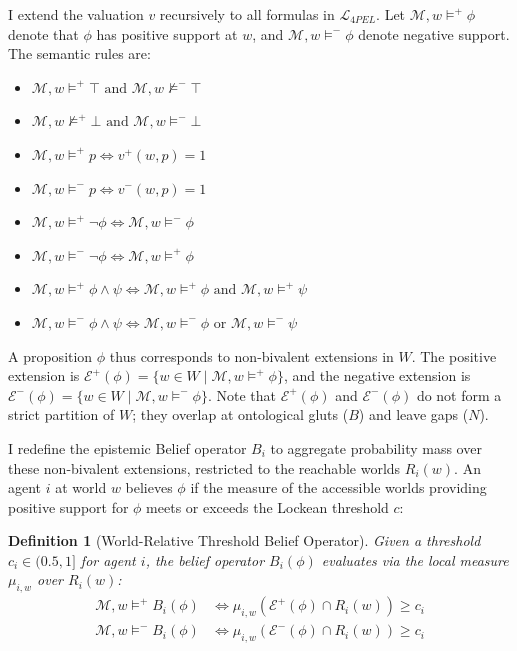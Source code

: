 \documentclass[11pt,a4paper]{article}
\newtheorem{definition}{Definition}[section]
\begin{document}
I extend the valuation $v$ recursively to all formulas in $\mathcal{L}_{4PEL}$. Let $\mathcal{M}, w \models^+ \phi$ denote that $\phi$ has positive support at $w$, and $\mathcal{M}, w \models^- \phi$ denote negative support. The semantic rules are:
\begin{itemize}
    \item $\mathcal{M}, w \models^+ \top \text{ and } \mathcal{M}, w \nvDash^- \top$
    \item $\mathcal{M}, w \nvDash^+ \bot \text{ and } \mathcal{M}, w \models^- \bot$
    \item $\mathcal{M}, w \models^+ p \iff v^+(w, p) = 1$
    \item $\mathcal{M}, w \models^- p \iff v^-(w, p) = 1$
    \item $\mathcal{M}, w \models^+ \neg\phi \iff \mathcal{M}, w \models^- \phi$
    \item $\mathcal{M}, w \models^- \neg\phi \iff \mathcal{M}, w \models^+ \phi$
    \item $\mathcal{M}, w \models^+ \phi \land \psi \iff \mathcal{M}, w \models^+ \phi \text{ and } \mathcal{M}, w \models^+ \psi$
    \item $\mathcal{M}, w \models^- \phi \land \psi \iff \mathcal{M}, w \models^- \phi \text{ or } \mathcal{M}, w \models^- \psi$
\end{itemize}

A proposition $\phi$ thus corresponds to non-bivalent extensions in $W$. The positive extension is $\mathcal{E}^+(\phi) = \{w \in W \mid \mathcal{M}, w \models^+ \phi\}$, and the negative extension is $\mathcal{E}^-(\phi) = \{w \in W \mid \mathcal{M}, w \models^- \phi\}$. Note that $\mathcal{E}^+(\phi)$ and $\mathcal{E}^-(\phi)$ do not form a strict partition of $W$; they overlap at ontological gluts ($B$) and leave gaps ($N$).

I redefine the epistemic Belief operator $B_i$ to aggregate probability mass over these non-bivalent extensions, restricted to the reachable worlds $R_i(w)$. An agent $i$ at world $w$ believes $\phi$ if the measure of the accessible worlds providing positive support for $\phi$ meets or exceeds the Lockean threshold $c$:

\begin{definition}[World-Relative Threshold Belief Operator]
Given a threshold $c_i \in (0.5, 1]$ for agent $i$, the belief operator $B_i(\phi)$ evaluates via the local measure $\mu_{i,w}$ over $R_i(w)$:
\begin{align}
    \mathcal{M}, w \models^+ B_i(\phi) &\iff \mu_{i,w}(\mathcal{E}^+(\phi) \cap R_i(w)) \ge c_i \\
    \mathcal{M}, w \models^- B_i(\phi) &\iff \mu_{i,w}(\mathcal{E}^-(\phi) \cap R_i(w)) \ge c_i
\end{align}
\end{definition}
\end{document}
